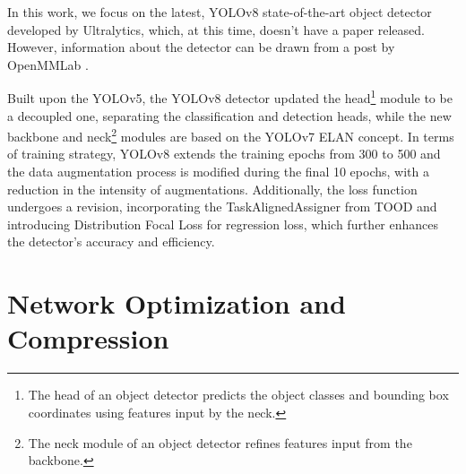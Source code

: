 In this work, we focus on the latest, YOLOv8 state-of-the-art object detector
\cite{YOLOv8} developed by Ultralytics, which, at this time, doesn't have a
paper released. However, information about the detector can be drawn from a post
by OpenMMLab \cite{YOLOv8OpenMMLab}.

Built upon the YOLOv5, the YOLOv8 detector updated the head\footnote{The head of
an object detector predicts the object classes and bounding box coordinates
using features input by the neck.} module to be a decoupled one, separating the
classification and detection heads, while the new backbone and neck\footnote{The
neck module of an object detector refines features input from the backbone.}
modules are based on the YOLOv7 ELAN concept. In terms of training strategy,
YOLOv8 extends the training epochs from 300 to 500 and the data augmentation
process is modified during the final 10 epochs, with a reduction in the
intensity of augmentations. Additionally, the loss function undergoes a
revision, incorporating the TaskAlignedAssigner from TOOD and introducing
Distribution Focal Loss for regression loss, which further enhances
the detector's accuracy and efficiency.









\section{Network Optimization and Compression}

